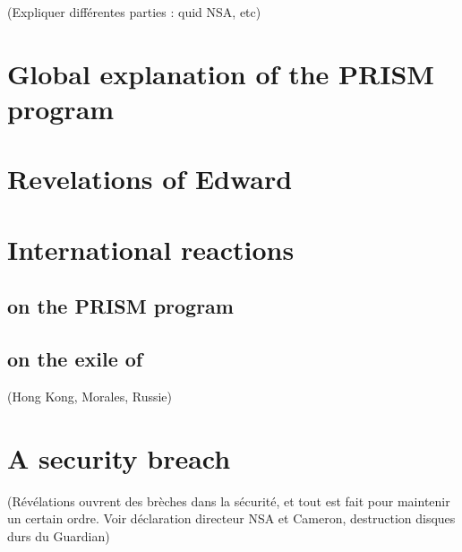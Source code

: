 \documentclass{article}
\begin{document}
\setcounter{tocdepth}{4}
\tableofcontents
\newpage


(Expliquer différentes parties : quid NSA, etc)
\section{Global explanation of the PRISM program}


\section{Revelations of Edward }


\section{International reactions}
\subsection{on the PRISM program}

\subsection{on the exile of }
(Hong Kong, Morales, Russie)

\section{A security breach}
(Révélations ouvrent des brèches dans la sécurité, et tout est fait pour maintenir un certain ordre. Voir déclaration directeur NSA et Cameron, destruction disques durs du Guardian)
\end{document}
